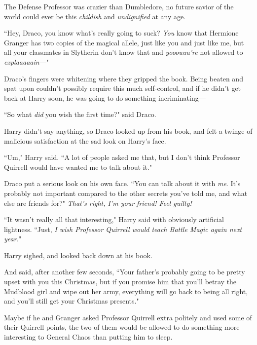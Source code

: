 The Defense Professor was crazier than Dumbledore, no future savior of the world could ever be this \emph{childish} and \emph{undignified} at any age.

``Hey, Draco, you know what's really going to suck? \emph{You} know that Hermione Granger has two copies of the magical allele, just like you and just like me, but all your classmates in Slytherin don't know that and \emph{yooouuu're} not allowed to \emph{explaaaaain}—"

Draco's fingers were whitening where they gripped the book. Being beaten and spat upon couldn't possibly require this much self-control, and if he didn't get back at Harry soon, he was going to do something incriminating—

``So what \emph{did} you wish the first time?" said Draco.

Harry didn't say anything, so Draco looked up from his book, and felt a twinge of malicious satisfaction at the sad look on Harry's face.

``Um," Harry said. ``A lot of people asked me that, but I don't think Professor Quirrell would have wanted me to talk about it."

Draco put a serious look on his own face. ``You can talk about it with \emph{me}. It's probably not important compared to the other secrets you've told me, and what else are friends for?" \emph{That's right, I'm your friend! Feel guilty!}

``It wasn't really all that interesting," Harry said with obviously artificial lightness. ``Just, \emph{I wish Professor Quirrell would teach Battle Magic again next year.}"

Harry sighed, and looked back down at his book.

And said, after another few seconds, ``Your father's probably going to be pretty upset with you this Christmas, but if you promise him that you'll betray the Mudblood girl and wipe out her army, everything will go back to being all right, and you'll still get your Christmas presents."

Maybe if he and Granger asked Professor Quirrell extra politely and used some of their Quirrell points, the two of them would be allowed to do something more interesting to General Chaos than putting him to sleep.

